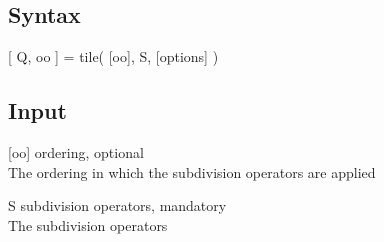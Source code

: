 \subsection*{Syntax}
\begin{param}
\item[{[ Q, oo ] = tile( [oo], S, [options] )}]
\end{param}

\subsection*{Input}
\begin{param}
\item[{[oo]}] ordering, optional\\
The ordering in which the subdivision operators are applied
\item[S] subdivision operators, mandatory\\
The subdivision operators
\end{param}


